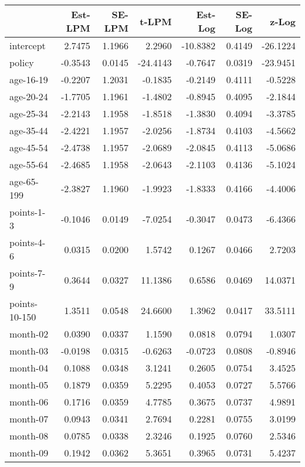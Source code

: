 \documentclass[10pt]{article}
\begin{document}
\begin{table}[ht]
\centering
\begin{tabular}{lrrrrrr}
  \hline
 & Est-LPM & SE-LPM & t-LPM & Est-Log & SE-Log & z-Log \\ 
  \hline
intercept & 2.7475 & 1.1966 & 2.2960 & -10.8382 & 0.4149 & -26.1224 \\ 
  policy & -0.3543 & 0.0145 & -24.4143 & -0.7647 & 0.0319 & -23.9451 \\ 
  age-16-19 & -0.2207 & 1.2031 & -0.1835 & -0.2149 & 0.4111 & -0.5228 \\ 
  age-20-24 & -1.7705 & 1.1961 & -1.4802 & -0.8945 & 0.4095 & -2.1844 \\ 
  age-25-34 & -2.2143 & 1.1958 & -1.8518 & -1.3830 & 0.4094 & -3.3785 \\ 
  age-35-44 & -2.4221 & 1.1957 & -2.0256 & -1.8734 & 0.4103 & -4.5662 \\ 
  age-45-54 & -2.4738 & 1.1957 & -2.0689 & -2.0845 & 0.4113 & -5.0686 \\ 
  age-55-64 & -2.4685 & 1.1958 & -2.0643 & -2.1103 & 0.4136 & -5.1024 \\ 
  age-65-199 & -2.3827 & 1.1960 & -1.9923 & -1.8333 & 0.4166 & -4.4006 \\ 
  points-1-3 & -0.1046 & 0.0149 & -7.0254 & -0.3047 & 0.0473 & -6.4366 \\ 
  points-4-6 & 0.0315 & 0.0200 & 1.5742 & 0.1267 & 0.0466 & 2.7203 \\ 
  points-7-9 & 0.3644 & 0.0327 & 11.1386 & 0.6586 & 0.0469 & 14.0371 \\ 
  points-10-150 & 1.3511 & 0.0548 & 24.6600 & 1.3962 & 0.0417 & 33.5111 \\ 
  month-02 & 0.0390 & 0.0337 & 1.1590 & 0.0818 & 0.0794 & 1.0307 \\ 
  month-03 & -0.0198 & 0.0315 & -0.6263 & -0.0723 & 0.0808 & -0.8946 \\ 
  month-04 & 0.1088 & 0.0348 & 3.1241 & 0.2605 & 0.0754 & 3.4525 \\ 
  month-05 & 0.1879 & 0.0359 & 5.2295 & 0.4053 & 0.0727 & 5.5766 \\ 
  month-06 & 0.1716 & 0.0359 & 4.7785 & 0.3675 & 0.0737 & 4.9891 \\ 
  month-07 & 0.0943 & 0.0341 & 2.7694 & 0.2281 & 0.0755 & 3.0199 \\ 
  month-08 & 0.0785 & 0.0338 & 2.3246 & 0.1925 & 0.0760 & 2.5346 \\ 
  month-09 & 0.1942 & 0.0362 & 5.3651 & 0.3965 & 0.0731 & 5.4237 \\ 

\end{tabular}
\end{table}
\end{document}
